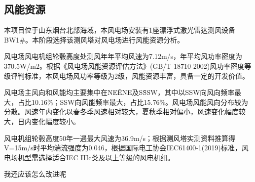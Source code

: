 \documentclass[12pt, letterpaper]{article}
\begin{document}
	\subsection{风能资源}
	本项目位于山东烟台北部海域，本风电场安装有1座漂浮式激光雷达测风设备BW1\#。本阶段选择该测风塔对风电场进行风能资源分析。
	
	风电场风电机组轮毂高度处测风年年平均风速为7.12m/s，年平均风功率密度为370.5W/m2。根据《风电场风能资源评估方法》(GB/T 18710-2002)风功率密度等级评判标准，本风电场风功率等级为2级，风能资源丰富，具备一定的开发价值。
	
	风电场主风向和风能均主要集中在NE\~ENE及S\~SSW，其中以SSW向风向频率最大，占比10.16\%；SSW向风能频率最大，占比15.76\%。风电场风能风向分布较为分散。风速年内变化以春冬季风速相对较大，夏秋季相对偏小，风速变化幅度较大，日内变化幅度较小。
	
	风电机组轮毂高度50年一遇最大风速为36.9m/s；根据测风塔实测资料推算得V=15m/s时平均湍流强度为0.046，根据国际电工协会IEC61400-1(2019)标准，风电场机型需选择适合IEC IIIc类及以上等级的风电机组。
	
	我还应该怎么改进呢
	
\end{document}
